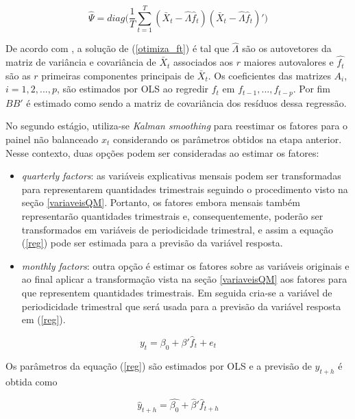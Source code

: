 \documentclass{article}
\begin{document}
\begin{equation}
\hat{\Psi} = diag\Bigg(\frac{1}{T} \sum_{t=1}^T (\bar{X}_t -\hat{\Lambda} \hat{f}_t)(\bar{X}_t -\hat{\Lambda} \hat{f}_t)'\Bigg)
\end{equation}

De acordo com \cite{stockwatson2011}, a solução de (\ref{otimiza_ft}) é tal que $\hat{\Lambda}$ são os autovetores da matriz de variância e covariância de $\bar{X}_t$ associados aos $r$ maiores autovalores e $\hat{f_t}$ são as $r$ primeiras componentes principais de $\bar{X}_t$. Os coeficientes das matrizes $A_i$, $i = 1,2,...,p$, são estimados por OLS ao regredir $f_t$ em $f_{t-1},...,f_{t-p}$. Por fim $BB'$ é estimado como sendo a matriz de covariância dos resíduos dessa regressão.

No segundo estágio, utiliza-se \textit{Kalman smoothing} para reestimar os fatores para o painel não balanceado $x_t$ considerando os parâmetros obtidos na etapa anterior. Nesse contexto, duas opções podem ser consideradas ao estimar os fatores:

\begin{itemize}
\item \textit{quarterly factors}: as variáveis explicativas mensais podem ser transformadas para representarem quantidades trimestrais seguindo o procedimento visto na seção \ref{variaveisQM}. Portanto, os fatores embora mensais também representarão quantidades trimestrais e, consequentemente, poderão ser transformados em variáveis de periodicidade trimestral, e assim a equação (\ref{reg}) pode ser estimada para a previsão da variável resposta.

\item \textit{monthly factors}: outra opção é estimar os fatores sobre as variáveis originais e ao final aplicar a transformação vista na seção \ref{variaveisQM} aos fatores para que representem quantidades trimestrais. Em seguida cria-se a variável de periodicidade trimestral que será usada para a previsão da variável resposta em (\ref{reg}).
\end{itemize}

\begin{equation}\label{reg}
y_t = \beta_0 + \beta' \hat{f}_t  + e_t
\end{equation}

Os parâmetros da equação (\ref{reg}) são estimados por OLS e a previsão de $y_{t+h}$ é obtida como

\begin{equation}
\hat{y}_{t+h} = \hat{\beta_0} + \hat{\beta}' \hat{f}_{t+h}
\end{equation}
\end{document}
